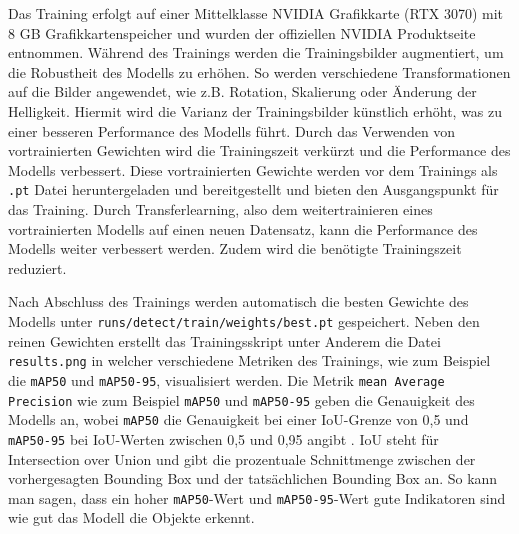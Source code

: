 Das Training erfolgt auf einer Mittelklasse NVIDIA Grafikkarte (RTX 3070) mit 8 GB Grafikkartenspeicher und wurden der offiziellen NVIDIA Produktseite entnommen.\cite{RTX3070Specs} Während des Trainings werden die Trainingsbilder augmentiert, um die Robustheit des Modells zu erhöhen. So werden verschiedene Transformationen auf die Bilder angewendet, wie z.B. Rotation, Skalierung oder Änderung der Helligkeit. Hiermit wird die Varianz der Trainingsbilder künstlich erhöht, was zu einer besseren Performance des Modells führt. \cite{YoloDataAugmentation} Durch das Verwenden von vortrainierten Gewichten wird die Trainingszeit verkürzt und die Performance des Modells verbessert. Diese vortrainierten Gewichte werden vor dem Trainings als \texttt{.pt} Datei heruntergeladen und bereitgestellt und bieten den Ausgangspunkt für das Training. Durch Transferlearning, also dem weitertrainieren eines vortrainierten Modells auf einen neuen Datensatz, kann die Performance des Modells weiter verbessert werden. Zudem wird die benötigte Trainingszeit reduziert. \cite{TransferLearningGlossary}


Nach Abschluss des Trainings werden automatisch die besten Gewichte des Modells unter \texttt{runs/detect/train/weights/best.pt} gespeichert. Neben den reinen Gewichten erstellt das Trainingsskript unter Anderem die Datei \texttt{results.png} in welcher verschiedene Metriken des Trainings, wie zum Beispiel die \texttt{mAP50} und \texttt{mAP50-95}, visualisiert werden. Die Metrik \texttt{mean Average Precision} wie zum Beispiel \texttt{mAP50} und \texttt{mAP50-95} geben die Genauigkeit des Modells an, wobei \texttt{mAP50} die Genauigkeit bei einer IoU-Grenze von 0,5 und \texttt{mAP50-95} bei IoU-Werten zwischen 0,5 und 0,95 angibt \cite{MAPGlossary}. IoU steht für Intersection over Union und gibt die prozentuale Schnittmenge zwischen der vorhergesagten Bounding Box und der tatsächlichen Bounding Box an.\cite{IOUGlossary}
So kann man sagen, dass ein hoher \texttt{mAP50}-Wert und \texttt{mAP50-95}-Wert gute Indikatoren sind wie gut das Modell die Objekte erkennt. \newpage



